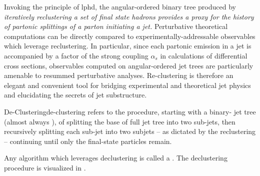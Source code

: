 Invoking the principle of \gls{lphd}, the angular-ordered binary tree produced by \textit{iteratively \gls{reclustering} a set of final state hadrons provides a proxy for the history of partonic splittings of a parton initiating a jet.}
%
Perturbative theoretical computations can be directly compared to experimentally-addressable observables which leverage \gls{reclustering}.
%
In particular, since each partonic emission in a jet is accompanied by a factor of the strong coupling \(\alpha_s\) in calculations of differential cross sections, observables computed on angular-ordered jet trees are particularly amenable to resummed perturbative analyses.
%
Re-clustering is therefore an elegant and convenient tool for bridging experimental and theoretical jet physics and elucidating the secrets of jet substructure.




\begin{definitionbox}{De-Clustering}{de-clustering}
     refers to the procedure, starting with a binary- jet tree (almost always ), of splitting the base of full jet tree into two sub-jets, then recursively splitting each sub-jet into two subjets -- as dictated by the reclustering -- continuing until only the final-state particles remain.

    Any algorithm which leverages \gls{declustering} is called a .
    The \gls{declustering} procedure is visualized in .
\end{definitionbox}




